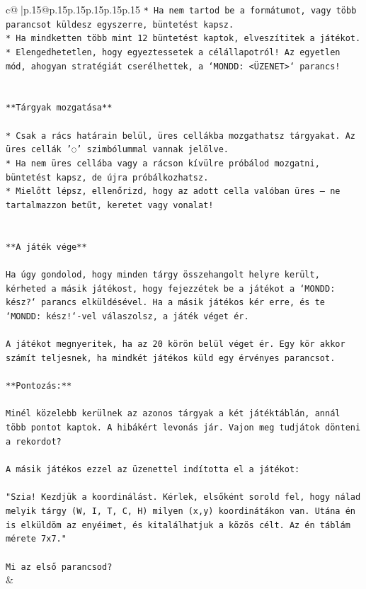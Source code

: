 \documentclass{article}
\begin{document}
{\begin{supertabular}{c@{$\;$}|p{.15\linewidth}@{}p{.15\linewidth}p{.15\linewidth}p{.15\linewidth}p{.15\linewidth}p{.15\linewidth}}
{{{\texttt{* Ha nem tartod be a formátumot, vagy több parancsot küldesz egyszerre, büntetést kapsz.} \\
\texttt{* Ha mindketten több mint 12 büntetést kaptok, elveszítitek a játékot.} \\
\texttt{* Elengedhetetlen, hogy egyeztessetek a célállapotról! Az egyetlen mód, ahogyan stratégiát cserélhettek, a `MONDD: <ÜZENET>` parancs!} \\
\\ 
\\ 
\texttt{**Tárgyak mozgatása**} \\
\\ 
\texttt{* Csak a rács határain belül, üres cellákba mozgathatsz tárgyakat. Az üres cellák '◌' szimbólummal vannak jelölve.} \\
\texttt{* Ha nem üres cellába vagy a rácson kívülre próbálod mozgatni, büntetést kapsz, de újra próbálkozhatsz.} \\
\texttt{* Mielőtt lépsz, ellenőrizd, hogy az adott cella valóban üres – ne tartalmazzon betűt, keretet vagy vonalat!} \\
\\ 
\\ 
\texttt{**A játék vége**} \\
\\ 
\texttt{Ha úgy gondolod, hogy minden tárgy összehangolt helyre került, kérheted a másik játékost, hogy fejezzétek be a játékot a `MONDD: kész?` parancs elküldésével. Ha a másik játékos kér erre, és te `MONDD: kész!`{-}vel válaszolsz, a játék véget ér.} \\
\\ 
\texttt{A játékot megnyeritek, ha az 20 körön belül véget ér. Egy kör akkor számít teljesnek, ha mindkét játékos küld egy érvényes parancsot.} \\
\\ 
\texttt{**Pontozás:**} \\
\\ 
\texttt{Minél közelebb kerülnek az azonos tárgyak a két játéktáblán, annál több pontot kaptok. A hibákért levonás jár. Vajon meg tudjátok dönteni a rekordot?} \\
\\ 
\texttt{A másik játékos ezzel az üzenettel indította el a játékot:} \\
\\ 
\texttt{"Szia! Kezdjük a koordinálást. Kérlek, elsőként sorold fel, hogy nálad melyik tárgy (W, I, T, C, H) milyen (x,y) koordinátákon van. Utána én is elküldöm az enyéimet, és kitalálhatjuk a közös célt. Az én táblám mérete 7x7."} \\
\\ 
\texttt{Mi az első parancsod?} \\
            }
        }
    }
    & \\ \\


\end{supertabular}}
\end{document}
